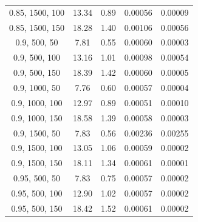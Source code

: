 \documentclass[
]{article}
\begin{document}
\begin{table}[H]
{\begin{tabular}{|c|c|c|c|c|}
                0.85, 1500, 100            & 13.34                  & 0.89                  & 0.00056                  & 0.00009                 \\
                0.85, 1500, 150            & 18.28                  & 1.40                  & 0.00106                  & 0.00056                 \\
                0.9, 500, 50               & 7.81                   & 0.55                  & 0.00060                  & 0.00003                 \\
                0.9, 500, 100              & 13.16                  & 1.01                  & 0.00098                  & 0.00054                 \\
                0.9, 500, 150              & 18.39                  & 1.42                  & 0.00060                  & 0.00005                 \\
                0.9, 1000, 50              & 7.76                   & 0.60                  & 0.00057                  & 0.00004                 \\
                0.9, 1000, 100             & 12.97                  & 0.89                  & 0.00051                  & 0.00010                 \\
                0.9, 1000, 150             & 18.58                  & 1.39                  & 0.00058                  & 0.00003                 \\
                0.9, 1500, 50              & 7.83                   & 0.56                  & 0.00236                  & 0.00255                 \\
                0.9, 1500, 100             & 13.05                  & 1.06                  & 0.00059                  & 0.00002                 \\
                0.9, 1500, 150             & 18.11                  & 1.34                  & 0.00061                  & 0.00001                 \\
                0.95, 500, 50              & 7.83                   & 0.75                  & 0.00057                  & 0.00002                 \\
                0.95, 500, 100             & 12.90                  & 1.02                  & 0.00057                  & 0.00002                 \\
                0.95, 500, 150             & 18.42                  & 1.52                  & 0.00061                  & 0.00002                 \\

\end{tabular}}
\end{table}
\end{document}
